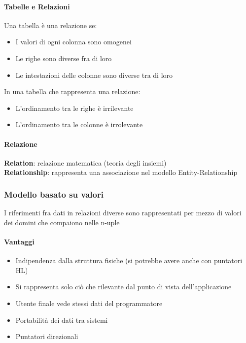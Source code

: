 \documentclass[12pt,a4paper]{article}
\begin{document}
\paragraph{Tabelle e Relazioni}
Una tabella è una relazione se:
\begin{itemize}
\item I valori di ogni colonna sono omogenei
\item Le righe sono diverse fra di loro
\item Le intestazioni delle colonne sono diverse tra di loro
\end{itemize}
In una tabella che rappresenta una relazione:
\begin{itemize}
\item L'ordinamento tra le righe è irrilevante
\item L'ordinamento tra le colonne è irrolevante
\end{itemize}

\paragraph{Relazione\\}
\textbf{Relation}: relazione matematica (teoria degli insiemi)\\
\textbf{Relationship}: rappresenta una associazione nel modello Entity-Relationship

\subsubsection{Modello basato su valori}
I riferimenti fra dati in relazioni diverse sono rappresentati per mezzo di valori dei domini che compaiono nelle n-uple
\paragraph{Vantaggi\\}
\begin{itemize}
\item Indipendenza dalla struttura fisiche (si potrebbe avere anche con puntatori HL)
\item Si rappresenta solo ciò che rilevante dal punto di vista dell’applicazione
\item Utente finale vede stessi dati del programmatore
\item Portabilità dei dati tra sistemi
\item Puntatori direzionali
\end{itemize}
\end{document}
